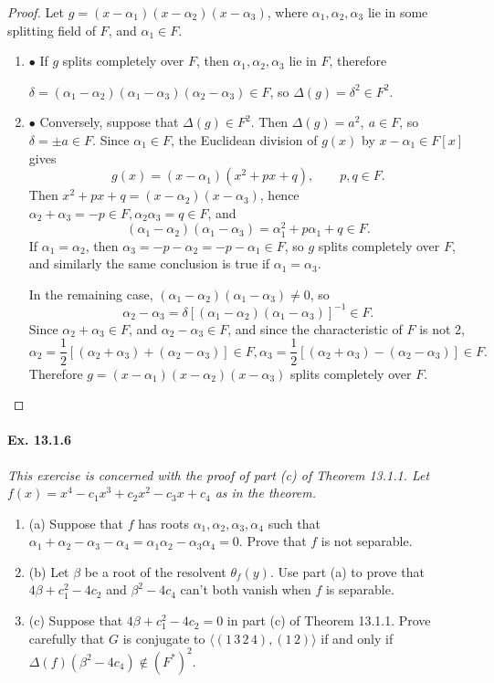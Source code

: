 \documentclass[11pt,a4paper]{article}
\newcommand{\be} {\begin{enumerate}}
\newcommand{\ee} {\end{enumerate}}
\begin{document}
\begin{proof}
Let $g = (x-\alpha_1)(x-\alpha_2)(x-\alpha_3)$, where $\alpha_1,\alpha_2,\alpha_3$ lie in some splitting field of $F$, and $\alpha_1 \in F$.
\be
\item[$\bullet$] If $g$ splits completely over $F$, then $\alpha_1,\alpha_2,\alpha_3$ lie in $F$, therefore 

${\delta = (\alpha_1 - \alpha_2)(\alpha_1-\alpha_3)(\alpha_2-\alpha_3) \in F}$, so
$\Delta(g)= \delta^2 \in F^2$.
\item[$\bullet$] Conversely, suppose that $\Delta(g) \in F^2$. Then $\Delta (g)= a^2, \ a \in F $, so $\delta =\pm a\in F$.
Since $\alpha_1 \in F$, the Euclidean division of $g(x)$ by $x-\alpha_1 \in F[x]$ gives 
$$g(x) = (x-\alpha_1)(x^2+px+q), \qquad p,q \in F.$$
Then $x^2+px+q = (x-\alpha_2)(x-\alpha_3)$, hence
$\alpha_2+\alpha_3 = -p \in F, \alpha_2\alpha_3 = q \in F$, and
$$(\alpha_1-\alpha_2)(\alpha_1 - \alpha_3) = \alpha_1^2  + p \alpha_1 +q \in F.$$
If $\alpha_1 = \alpha_2$, then $\alpha_3 = -p - \alpha_2 = -p - \alpha_1 \in F$, so $g$ splits completely over $F$, and similarly the same conclusion is true if $\alpha_1 = \alpha_3$. 

In the remaining case, $(\alpha_1-\alpha_2)(\alpha_1 - \alpha_3) \ne 0$, so
$$\alpha_2 - \alpha_3 = \delta [(\alpha_1-\alpha_2)(\alpha_1 - \alpha_3)]^{-1} \in F.$$
Since $\alpha_2 + \alpha_3 \in F$, and $\alpha_2 - \alpha_3 \in F$, and since the characteristic of $F$ is not 2,
$$\alpha_2 = \frac{1}{2}[(\alpha_2 + \alpha_3) +(\alpha_2-\alpha_3)] \in F, \alpha_3 = \frac{1}{2}[(\alpha_2 + \alpha_3) -(\alpha_2-\alpha_3)] \in F.$$
Therefore $g = (x-\alpha_1)(x-\alpha_2)(x-\alpha_3)$ splits completely over $F$.
\ee
\end{proof}

\paragraph{Ex. 13.1.6}

{\it This exercise is concerned with the proof of part (c) of Theorem 13.1.1. Let $f(x) = x^4-c_1x^3+c_2x^2-c_3x+c_4$ as in the theorem.
\be
\item[(a)] Suppose that $f$ has roots $\alpha_1,\alpha_2,\alpha_3,\alpha_4$ such that $\alpha_1+\alpha_2 - \alpha_3-\alpha_4 = \alpha_1\alpha_2 - \alpha_3 \alpha_4 = 0$. Prove that $f$ is not separable.
\item[(b)] Let $\beta$ be a root of the resolvent $\theta_f(y)$. Use part (a) to prove that $4\beta+c_1^2-4c_2$ and $\beta^2 - 4 c_4$ can't both vanish when $f$ is separable.
\item[(c)] Suppose that $4\beta+c_1^2-4c_2=0$ in part (c) of Theorem 13.1.1. Prove carefully that $G$ is conjugate to $\langle (1\,3\,2\,4),(1\,2) \rangle$ if and only if $\Delta(f)(\beta^2 - 4 c_4) \not \in (F^*)^2$.
\ee
}
\end{document}
